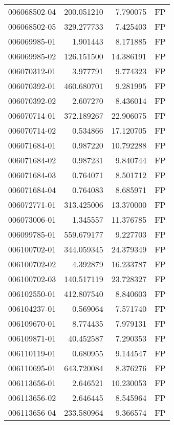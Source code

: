 \begin{tabular}{lrrl}
006068502-04 &  200.051210 &       7.790075 &   FP \\
006068502-05 &  329.277733 &       7.425403 &   FP \\
006069985-01 &    1.901443 &       8.171885 &   FP \\
006069985-02 &  126.151500 &      14.386191 &   FP \\
006070312-01 &    3.977791 &       9.774323 &   FP \\
006070392-01 &  460.680701 &       9.281995 &   FP \\
006070392-02 &    2.607270 &       8.436014 &   FP \\
006070714-01 &  372.189267 &      22.906075 &   FP \\
006070714-02 &    0.534866 &      17.120705 &   FP \\
006071684-01 &    0.987220 &      10.792288 &   FP \\
006071684-02 &    0.987231 &       9.840744 &   FP \\
006071684-03 &    0.764071 &       8.501712 &   FP \\
006071684-04 &    0.764083 &       8.685971 &   FP \\
006072771-01 &  313.425006 &      13.370000 &   FP \\
006073006-01 &    1.345557 &      11.376785 &   FP \\
006099785-01 &  559.679177 &       9.227703 &   FP \\
006100702-01 &  344.059345 &      24.379349 &   FP \\
006100702-02 &    4.392879 &      16.233787 &   FP \\
006100702-03 &  140.517119 &      23.728327 &   FP \\
006102550-01 &  412.807540 &       8.840603 &   FP \\
006104237-01 &    0.569064 &       7.571740 &   FP \\
006109670-01 &    8.774435 &       7.979131 &   FP \\
006109871-01 &   40.452587 &       7.290353 &   FP \\
006110119-01 &    0.680955 &       9.144547 &   FP \\
006110695-01 &  643.720084 &       8.376276 &   FP \\
006113656-01 &    2.646521 &      10.230053 &   FP \\
006113656-02 &    2.646445 &       8.545964 &   FP \\
006113656-04 &  233.580964 &       9.366574 &   FP \\

\end{tabular}
